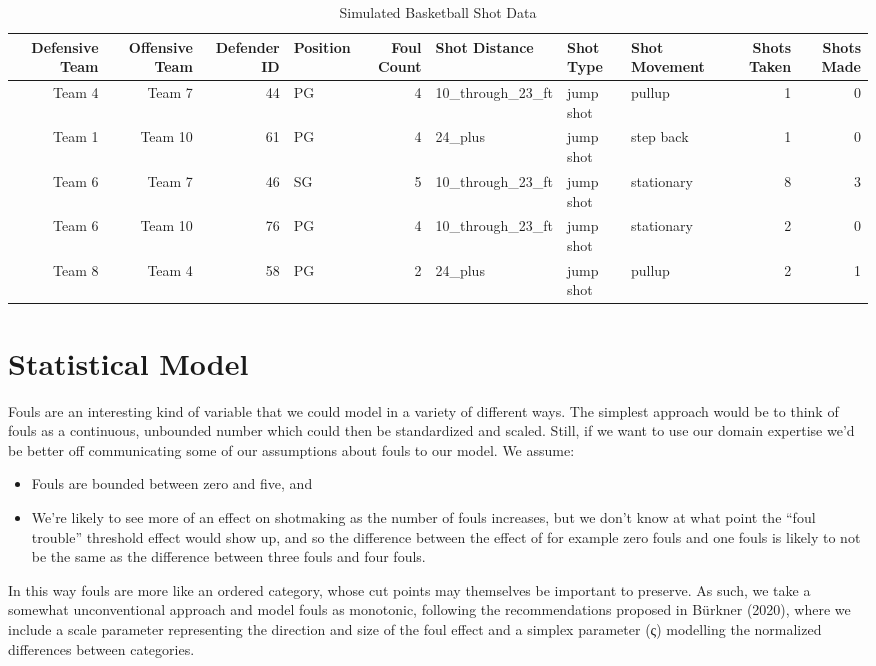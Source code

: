 \documentclass[
  letterpaper,
  DIV=11,
  numbers=noendperiod]{scrartcl}
\begin{document}
\begin{table}
\caption*{
{\large Simulated Basketball Shot Data}
} 
\fontsize{12.0pt}{14.4pt}\selectfont
\begin{tabular*}{\linewidth}{@{\extracolsep{\fill}}rrrlrlllrr}
\toprule
Defensive Team & Offensive Team & Defender ID & Position & Foul Count & Shot Distance & Shot Type & Shot Movement & Shots Taken & Shots Made \\ 
\midrule\addlinespace[2.5pt]
Team 4 & Team 7 & 44 & PG & 4 & 10\_through\_23\_ft & jump shot & pullup & 1 & 0 \\ 
Team 1 & Team 10 & 61 & PG & 4 & 24\_plus & jump shot & step back & 1 & 0 \\ 
Team 6 & Team 7 & 46 & SG & 5 & 10\_through\_23\_ft & jump shot & stationary & 8 & 3 \\ 
Team 6 & Team 10 & 76 & PG & 4 & 10\_through\_23\_ft & jump shot & stationary & 2 & 0 \\ 
Team 8 & Team 4 & 58 & PG & 2 & 24\_plus & jump shot & pullup & 2 & 1 \\ 
\bottomrule
\end{tabular*}
\end{table}

\section{Statistical Model}\label{statistical-model}

Fouls are an interesting kind of variable that we could model in a
variety of different ways. The simplest approach would be to think of
fouls as a continuous, unbounded number which could then be standardized
and scaled. Still, if we want to use our domain expertise we'd be better
off communicating some of our assumptions about fouls to our model. We
assume:

\begin{itemize}
\item
  Fouls are bounded between zero and five, and
\item
  We're likely to see more of an effect on shotmaking as the number of
  fouls increases, but we don't know at what point the ``foul trouble''
  threshold effect would show up, and so the difference between the
  effect of for example zero fouls and one fouls is likely to not be the
  same as the difference between three fouls and four fouls.
\end{itemize}

In this way fouls are more like an ordered category, whose cut points
may themselves be important to preserve. As such, we take a somewhat
unconventional approach and model fouls as monotonic, following the
recommendations proposed in Bürkner (2020), where we include a scale
parameter representing the direction and size of the foul effect and a
simplex parameter (ς) modelling the normalized differences between
categories.
\end{document}
